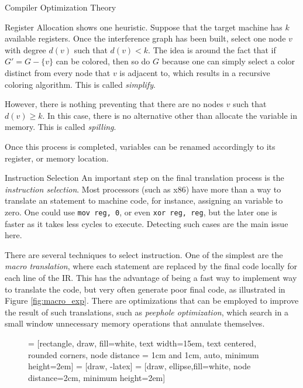 \begin{section}{Compiler Optimization Theory}
\begin{subsection}{Register Allocation}
\cite{appel2004modern} shows one heuristic. Suppose that the target machine has
$k$ available registers. Once the interference graph has been built, select one
node $v$ with degree $d(v)$ such that $d(v) < k$. The idea is around the fact that
if $G' = G - \{v\}$ can be colored, then so do $G$ because one can simply select
a color distinct from every node that $v$ is adjacent to, which results in a 
recursive coloring algorithm. This is called \textit{simplify}.

However, there is nothing preventing that there are no nodes $v$ such that
$d(v) \geq k$. In this case, there is no alternative other than allocate the
variable in memory. This is called \textit{spilling}.

Once this process is completed, variables can be renamed accordingly to its
register, or memory location.

\end{subsection}

\begin{subsection}{Instruction Selection}
	An important step on the final translation process is the
	\textit{instruction selection}. Most processors (such as x86) have more
	than a way to translate an statement to machine code, for instance, 
	assigning an variable to zero. One could use \texttt{mov reg, 0}, or
	even \texttt{xor reg, reg}, but the later one is faster as it takes less
	cycles to execute. Detecting such cases are the main issue here.

	There are several techniques to select instruction. One of the simplest
	are the \textit{macro translation}, where each statement are replaced
	by the final code locally for each line of the IR. This has the advantage
	of being a fast way to implement way to translate the code, but
	very often generate poor final code, as illustrated in
	Figure \ref{fig:macro_exp}. There are optimizations that can be employed
	to improve the result of such translations, such as
	\textit{peephole optimization}, which search in a small window unnecessary
	memory operations that annulate themselves.

\begin{figure}
 = [rectangle, draw, fill=white,
    text width=15em, text centered, rounded corners, node distance = 1cm and 1cm, auto, minimum height=2em]
 = [draw, -latex]
 = [draw, ellipse,fill=white, node distance=2cm,
    minimum height=2em]

\begin{center}
\end{center}
\end{figure}
\end{subsection}
\end{section}
